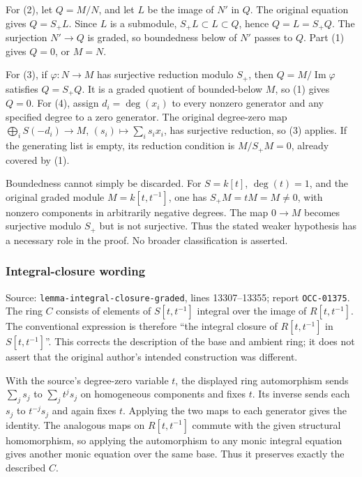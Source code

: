 For (2), let \(Q=M/N\), and let \(L\) be the image of \(N'\) in \(Q\). The original equation gives \(Q=S_+L\). Since \(L\) is a submodule, \(S_+L\subset L\subset Q\), hence \(Q=L=S_+Q\). The surjection \(N'\to Q\) is graded, so boundedness below of \(N'\) passes to \(Q\). Part (1) gives \(Q=0\), or \(M=N\).

For (3), if \(\varphi:N\to M\) has surjective reduction modulo \(S_+\), then \(Q=M/\operatorname{Im}\varphi\) satisfies \(Q=S_+Q\). It is a graded quotient of bounded-below \(M\), so (1) gives \(Q=0\). For (4), assign \(d_i=\deg(x_i)\) to every nonzero generator and any specified degree to a zero generator. The original degree-zero map \(\bigoplus_i S(-d_i)\to M\), \((s_i)\mapsto\sum_i s_i x_i\), has surjective reduction, so (3) applies. If the generating list is empty, its reduction condition is \(M/S_+M=0\), already covered by (1).

Boundedness cannot simply be discarded. For \(S=k[t]\), \(\deg(t)=1\), and the original graded module \(M=k[t,t^{-1}]\), one has \(S_+M=tM=M\ne0\), with nonzero components in arbitrarily negative degrees. The map \(0\to M\) becomes surjective modulo \(S_+\) but is not surjective. Thus the stated weaker hypothesis has a necessary role in the proof. No broader classification is asserted.

\subsubsection{Integral-closure wording}\label{algebra-proof-002-integral-closure-wording}

Source: \texttt{lemma-integral-closure-graded}, lines 13307--13355; report \texttt{OCC-01375}. The ring \(C\) consists of elements of \(S[t,t^{-1}]\) integral over the image of \(R[t,t^{-1}]\). The conventional expression is therefore ``the integral closure of \(R[t,t^{-1}]\) in \(S[t,t^{-1}]\)''. This corrects the description of the base and ambient ring; it does not assert that the original author's intended construction was different.

With the source's degree-zero variable \(t\), the displayed ring automorphism sends \(\sum_j s_j\) to \(\sum_j t^j s_j\) on homogeneous components and fixes \(t\). Its inverse sends each \(s_j\) to \(t^{-j}s_j\) and again fixes \(t\). Applying the two maps to each generator gives the identity. The analogous maps on \(R[t,t^{-1}]\) commute with the given structural homomorphism, so applying the automorphism to any monic integral equation gives another monic equation over the same base. Thus it preserves exactly the described \(C\).

